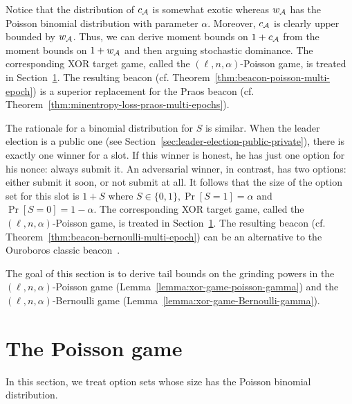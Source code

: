 Notice that the distribution of $c_{\mathcal{A}}$ is somewhat exotic 
whereas $w_{\mathcal{A}}$ has the Poisson binomial distribution with parameter $\alpha$.
Moreover, $c_{\mathcal{A}}$ is clearly upper bounded by $w_{\mathcal{A}}$. 
Thus, we can derive moment bounds on $1 + c_{\mathcal{A}}$ from 
the moment bounds on $1 + w_{\mathcal{A}}$ 
and then arguing stochastic dominance.
The corresponding XOR target game, called the $(\ell, n, \alpha)$-Poisson game, 
is treated in Section~\ref{sec:poisson}. 
The resulting beacon (cf. Theorem~\ref{thm:beacon-poisson-multi-epoch}) 
is a superior replacement for the Praos beacon (cf. Theorem~\ref{thm:minentropy-loss-praos-multi-epochs}).


The rationale for a binomial distribution for $S$ is similar.
When the leader election is a public one (see Section~\ref{sec:leader-election-public-private}), 
there is exactly one winner for a slot. 
If this winner is honest, he has just one option for his nonce: always submit it.
An adversarial winner, in contrast, has two options: 
either submit it soon, or not submit at all. 
It follows that the size of the option set for this slot is $1+S$ where 
$S \in \{0,1\}, \Pr[S = 1] = \alpha$ and $\Pr[S = 0] = 1 - \alpha$.
The corresponding XOR target game, called the $(\ell, n, \alpha)$-Poisson game, 
is treated in Section~\ref{sec:poisson}.
The resulting beacon (cf. Theorem~\ref{thm:beacon-bernoulli-multi-epoch}) 
can be an alternative to the Ouroboros classic beacon~\cite{Ouroboros}.


The goal of this section is to derive tail bounds on 
the grinding powers in the $(\ell,n,\alpha)$-Poisson game 
(Lemma~\ref{lemma:xor-game-poisson-gamma})
and the $(\ell, n, \alpha)$-Bernoulli game 
(Lemma~\ref{lemma:xor-game-Bernoulli-gamma}).






%

\section{The Poisson game}\label{sec:poisson}

  In this section, 
  we treat option sets whose size has the Poisson binomial distribution.


